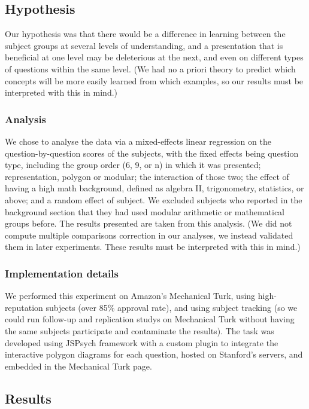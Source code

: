 \documentclass[11pt]{article}
\begin{document}
\subsection{Hypothesis}
Our hypothesis was that there would be a difference in learning between the subject groups at several levels of understanding, and a presentation that is beneficial at one level may be deleterious at the next, and even on different types of questions within the same level. (We had no a priori theory to predict which concepts will be more easily learned from which examples, so our results must be interpreted with this in mind.)
\subsubsection{Analysis}
We chose to analyse the data via a mixed-effects linear regression on the question-by-question scores of the subjects, with the fixed effects being question type, including the group order (6, 9, or n) in which it was presented; representation, polygon or modular; the interaction of those two; the effect of having a high math background, defined as algebra II, trigonometry, statistics, or above; and a random effect of subject. We excluded subjects who reported in the background section that they had used modular arithmetic or mathematical groups before. The results presented are taken from this analysis. (We did not compute multiple comparisons correction in our analyses, we instead validated them in later experiments. These results must be interpreted with this in mind.) 
\subsubsection{Implementation details}
We performed this experiment on Amazon's Mechanical Turk, using high-reputation subjects (over 85\% approval rate), and using subject tracking (so we could run follow-up and replication studys on Mechanical Turk without having the same subjects participate and contaminate the results). The task was developed using JSPsych framework with a custom plugin to integrate the interactive polygon diagrams for each question, hosted on Stanford's servers, and embedded in the Mechanical Turk page.  
\subsection{Results} %
\end{document}
